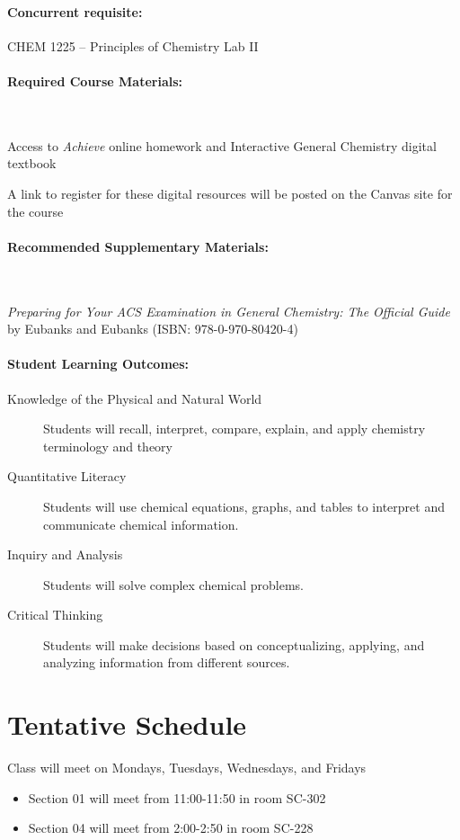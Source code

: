 \documentclass[12pt, letterpaper]{article}
\begin{document}
\paragraph{Concurrent requisite:}
CHEM 1225 -- Principles of Chemistry Lab II

\paragraph{Required Course Materials:} ~

Access to \emph{Achieve} online homework and Interactive General Chemistry digital textbook

\noindent A link to register for these digital resources will be posted on the Canvas site for the course

\paragraph{Recommended Supplementary Materials:} ~

\emph{Preparing for Your ACS Examination in General Chemistry: The Official Guide} by Eubanks and Eubanks (ISBN: 978-0-970-80420-4)

\paragraph{Student Learning Outcomes:}
\begin{description}
	\item[Knowledge of the Physical and Natural World] Students will recall, interpret, compare, explain, and apply chemistry terminology and theory
	\item[Quantitative Literacy] Students will use chemical equations, graphs, and tables to interpret and communicate chemical information.
	\item[Inquiry and Analysis] Students will solve complex chemical problems.
	\item[Critical Thinking] Students will make decisions based on conceptualizing, applying, and analyzing information from different sources.
\end{description}

\section*{Tentative Schedule}
Class will meet on Mondays, Tuesdays, Wednesdays, and Fridays
\begin{itemize}
  \item Section 01 will meet from 11:00-11:50 in room SC-302
  \item Section 04 will meet from 2:00-2:50 in room SC-228
\end{itemize}
\end{document}
